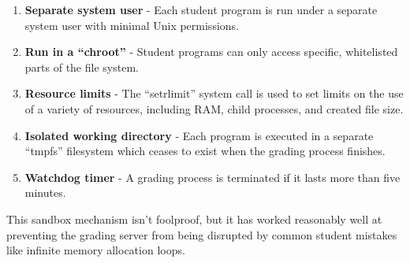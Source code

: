 \documentclass[11pt]{amsart}
\begin{document}
\begin{enumerate}
\item \textbf{Separate system user} - Each student program is run under
  a separate system user with minimal Unix permissions.
\item \textbf{Run in a ``chroot''} - Student programs can only access
  specific, whitelisted parts of the file system.
\item \textbf{Resource limits} - The ``setrlimit'' system call is used to
  set limits on the use of a variety of resources, including RAM, child
  processes, and created file size.
\item \textbf{Isolated working directory} - Each program is executed in
  a separate ``tmpfs'' filesystem which ceases to exist when the grading
  process finishes.
\item \textbf{Watchdog timer} - A grading process is terminated if it lasts
  more than five minutes.
\end{enumerate}

This sandbox mechanism isn't foolproof, but it has worked reasonably
well at preventing the grading server from being disrupted by common
student mistakes like infinite memory allocation loops.
\end{document}
